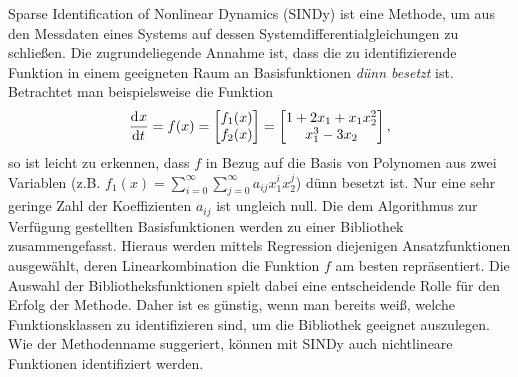 
Sparse Identification of Nonlinear Dynamics (SINDy) ist eine Methode, um aus den Messdaten eines Systems auf dessen Systemdifferentialgleichungen zu schließen. Die zugrundeliegende Annahme ist, dass die zu identifizierende Funktion in einem geeigneten Raum an Basisfunktionen \textit{dünn besetzt} ist. Betrachtet man beispielsweise die Funktion
\begin{equation}
\frac{\mathrm{d}^{}x}{\mathrm{d}{t}^{}} = f(x) = \begin{bmatrix} f_1(x)\\ f_2(x)\\ \end{bmatrix}
=\begin{bmatrix} 1+2x_1+x_1x_2^2 \\ x_1^3-3x_2\\ \end{bmatrix},
\end{equation}
so ist leicht zu erkennen, dass $f$ in Bezug auf die Basis von Polynomen aus zwei Variablen (z.B. $f_1(x)=\sum_{i=0}^{\infty}\sum_{j=0}^{\infty}a_{ij}x_1^ix_2^j$) dünn besetzt ist. Nur eine sehr geringe Zahl der Koeffizienten $a_{ij}$ ist ungleich null. 
Die dem Algorithmus zur Verfügung gestellten Basisfunktionen werden zu einer Bibliothek zusammengefasst. Hieraus werden mittels Regression diejenigen Ansatzfunktionen ausgewählt, deren Linearkombination die Funktion $f$ am besten repräsentiert. Die Auswahl der Bibliotheksfunktionen spielt dabei eine entscheidende Rolle für den Erfolg der Methode. Daher ist es günstig, wenn man bereits weiß, welche Funktionsklassen zu identifizieren sind, um die Bibliothek geeignet auszulegen. Wie der Methodenname suggeriert, können mit SINDy auch nichtlineare Funktionen identifiziert werden. 